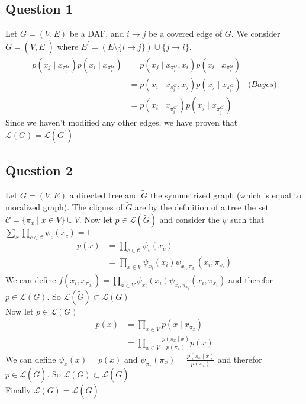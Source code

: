 \documentclass[a4paper]{article}
\begin{document}
\subsection{Question 1}
Let $G = (V,E)$ be a DAF, and $i\rightarrow j$ be a covered edge of $G$. We consider $G = (V,E^\prime)$ where $E^\prime = (E \setminus \{i \rightarrow j \}) \cup \{j \rightarrow i \}$.
\begin{align*}
p(x_j \mid x_{\pi_j^G})p(x_i \mid x_{\pi_i^G}) &= p(x_j \mid x_{\pi_i^G}, x_i)p(x_i \mid x_{\pi_i^G}) \\
&= p(x_i \mid x_{\pi_i^G}, x_j)p(x_j \mid x_{\pi_i^G}) &\textit{(Bayes)} \\
&= p(x_i \mid x_{\pi_i^{G^\prime}})p(x_j \mid x_{\pi_j^{G^\prime}})
\end{align*}
Since we haven't modified any other edges, we have proven that $\mathcal{L}(G) = \mathcal{L}(G^\prime)$
\subsection{Question 2}
Let $G=(V,E)$ a directed tree and $\tilde{G}$ the symmetrized graph (which is equal to moralized graph). The cliques of $\tilde{G}$ are by the definition of a tree the set $\mathcal{C} = \{ \pi_x \mid x \in V\} \cup V$. Now let $p \in \mathcal{L}(\tilde{G})$ and consider the $\psi$ such that $\sum_{x} \prod_{c\in \mathcal{C}} \psi_c(x_c) = 1$
\begin{align*}
p(x) &= \prod_{c \in \mathcal{C}}\psi_c(x_c) \\
&= \prod_{x \in V}\psi_{x_i}(x_i)\psi_{x_i, \pi_{x_i}}(x_i,\pi_{x_i})
\end{align*}
We can define $f(x_i,x_{\pi_{x_i}}) = \prod_{x \in V}\psi_{x_i}(x_i)\psi_{x_i, \pi_{x_i}}(x_i,\pi_{x_i})$ and therefor $p \in \mathcal{L}(G)$. So $\mathcal{L}(\tilde{G}) \subset \mathcal{L}(G)$ \\
Now let $p \in \mathcal{L}(G)$
\begin{align*}
p(x) &= \prod_{x \in V} p(x \mid x_{\pi_{x}}) \\
&= \prod_{x \in V} \frac{p(\pi_{x} \mid x)}{p(\pi_x)} p(x)
\end{align*}
We can define $\psi_{x}(x) = p(x)$ and $\psi_{\pi_x}(\pi_x) = \frac{p(\pi_{x} \mid x)}{p(\pi_x)}$ and therefor $p \in \mathcal{L}(\tilde{G})$. So $\mathcal{L}(G) \subset \mathcal{L}(\tilde{G})$ \\
Finally $\mathcal{L}(G) = \mathcal{L}(\tilde{G})$
\end{document}
